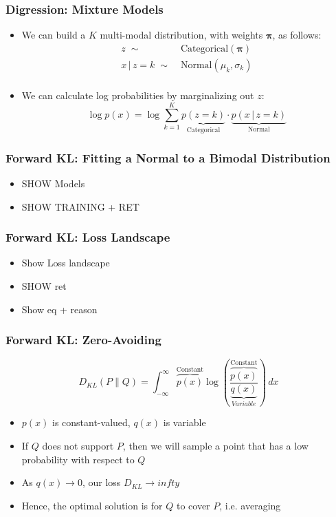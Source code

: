 \documentclass{beamer}
\begin{document}
\begin{frame}
  \frametitle{Digression: Mixture Models}
  \begin{itemize}
    \item We can build a $K$ multi-modal distribution, with weights
      $\mathbf{\pi}$, as follows:
    \begin{equation*}
      \begin{aligned}
      z \; \sim& \; \text{Categorical}(\mathbf{\pi}) \\
      x \,|\, z = k \; \sim& \; \text{Normal}(\mu_k, \sigma_k) \\
    \end{aligned}
    \end{equation*}
    \item We can calculate log probabilities by marginalizing out $z$:
    \begin{equation*}
      \log p(x) = \log \sum_{k=1}^{K} \underbrace{p(z = k)}_{\text{Categorical}} \cdot \underbrace{p(x \,|\, z=k)}_{\text{Normal}}
    \end{equation*}
  \end{itemize}

\end{frame}


\begin{frame}
  \frametitle{Forward KL: Fitting a Normal to a Bimodal Distribution}
  \begin{itemize}
    \item SHOW Models
    \item SHOW TRAINING + RET
  \end{itemize}
\end{frame}


\begin{frame}
  \frametitle{Forward KL: Loss Landscape}
  \begin{itemize}
    \item Show Loss landscape
    \item SHOW ret
    \item Show eq + reason
  \end{itemize}
\end{frame}

\begin{frame}
  \frametitle{Forward KL: Zero-Avoiding}
  \begin{equation*}
    D_{KL} (P \parallel Q) = \int_{-\infty}^{\infty} \overbrace{p(x)}^{\text{Constant}}\log \left({\frac {\overbrace{p(x)}^{\text{Constant}}}{\underbrace{q(x)}_{Variable}}}\right)\,dx
  \end{equation*}
  \begin{itemize}
    \item $p(x)$ is constant-valued, $q(x)$ is variable
    \item If $Q$ does not support $P$, then we will sample a point that has a low
      probability with respect to $Q$
    \pause
    \item As $q(x) \to 0$, our loss $D_{KL} \to infty$
    \pause
    \item Hence, the optimal solution is for $Q$ to cover $P$, i.e. averaging
  \end{itemize}
\end{frame}
\end{document}
